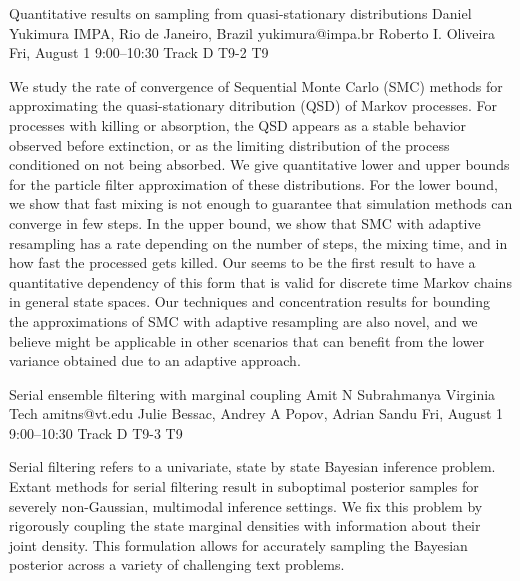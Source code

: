 \begin{talk}
  {Quantitative results on sampling from quasi-stationary distributions}%
  {Daniel Yukimura}%
  {IMPA, Rio de Janeiro, Brazil}%
  {yukimura@impa.br}%
  {Roberto I. Oliveira}%
  {}%
  {Fri, August 1 9:00–10:30 Track D}%
  {T9-2}%
  {T9}%
  
				
			
    We study the rate of convergence of Sequential Monte Carlo (SMC) methods for approximating the quasi-stationary ditribution (QSD) of Markov processes. 
    For processes with killing or absorption, the QSD appears as a stable behavior observed before extinction, or as the limiting distribution of the process conditioned on not being absorbed. 
    We give quantitative lower and upper bounds for the particle filter approximation of these distributions.
    For the lower bound, we show that fast mixing is not enough to guarantee that simulation methods can converge in few steps.
    In the upper bound, we show that SMC with adaptive resampling has a rate depending on the number of steps, the mixing time, and in how fast the processed gets killed.
    Our seems to be the first result to have a quantitative dependency of this form that is valid for discrete time Markov chains in general state spaces.
    Our techniques and concentration results for bounding the approximations of SMC with adaptive resampling are also novel, and we believe might be applicable in other scenarios that can benefit from the lower variance obtained due to an adaptive approach.
    
    

\medskip


\end{talk}

\begin{talk}
  {Serial ensemble filtering with marginal coupling}%
  {Amit N Subrahmanya}%
  {Virginia Tech}%
  {amitns@vt.edu}%
  {Julie Bessac, Andrey A Popov, Adrian Sandu}%
  {}%
  {Fri, August 1 9:00–10:30 Track D}%
  {T9-3}%
  {T9}%
  
				
			
 Serial filtering refers to a univariate, state by state Bayesian inference problem. 
 Extant methods for serial filtering result in suboptimal posterior samples for severely non-Gaussian, multimodal inference settings. 
 We fix this problem by rigorously coupling the state marginal densities with information about their joint density.
 This formulation allows for accurately sampling the Bayesian posterior across a variety of challenging text problems.
 
\medskip

\end{talk}

